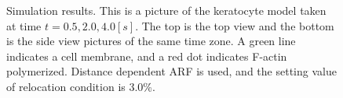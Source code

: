 \documentclass[a4paper,12pt]{book}
\begin{document}
\begin{figure}[h]
{ }%
 \caption{Simulation results. This is a picture of the keratocyte model taken at time $t = 0.5, 2.0, 4.0 [s]$. The top is the top view and the bottom is the side view pictures of the same time zone. A green line indicates a cell membrane, and a red dot indicates F-actin polymerized. Distance dependent ARF is used, and the setting value of relocation condition is 3.0\%.}
 \label{fig:res0}
\end{figure}
\end{document}
